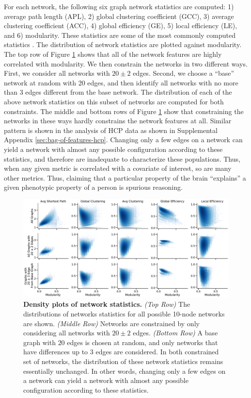 For each network, the following six graph network statistics are computed: 1) average path length (APL), 2) global clustering coefficient (GCC), 3) average clustering coefficient (ACC), 4) global efficiency (GE), 5) local efficiency (LE), and 6) modularity. These statistics are some of the most commonly computed statistics \cite{sporns2005human,Bullmore2009-yj}. The distribution of network statistics are plotted against modularity. 
The top row of Figure \ref{fig:exp6} shows that all of the network features are highly correlated with modularity.
We then constrain the networks in two different ways. First, we consider all networks with $20 \pm 2$ edges. Second, we choose a ``base'' network at random with 20 edges, and then identify all networks with no more than 3 edges different from the  base network. The distribution of each of the above network statistics on this subset of networks are computed for both constraints. The middle and bottom rows of Figure \ref{fig:exp6} show that constraining the networks in these ways hardly constrains the network features at all. Similar pattern is shown in the analysis of HCP data as shown in Supplemental Appendix \ref{sec:bag-of-features-hcp}. Changing only a few edges on a network can yield a network with almost any possible configuration according to these statistics, and therefore are inadequate to characterize these populations. Thus, when any given metric is correlated with a covariate of interest, so are many other metrics. Thus, claiming that a particular property of the brain ``explains'' a given phenotypic property of a person is spurious reasoning.

\begin{figure} 
    \centering
    \includegraphics[width=\textwidth]{figures/dnd/density_num_edge_20_row}
    \caption{\textbf{Density plots of network statistics.} \textit{(Top Row)} The distributions of networks statistics for all possible 10-node networks are shown. \textit{(Middle Row)} Networks are constrained by only considering all networks with $20 \pm 2$ edges. \textit{(Bottom Row)} A base graph with $20$ edges is chosen at random, and only networks that have differences up to $3$ edges are considered. In both constrained set of networks, the distribution of these network statistics remains essentially unchanged. In other words, changing only a few edges on a network can yield a network with almost any possible configuration according to these statistics. }
    \label{fig:exp6}
\end{figure}

